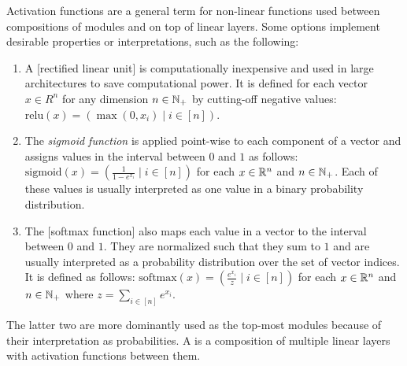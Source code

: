 \documentclass[../document.tex]{subfiles}
\begin{document}
    Activation functions are a general term for non-linear functions used between compositions of modules and on top of linear layers.
    Some options implement desirable properties or interpretations, such as the following:
    \begin{enumerate}
        \item
            A [rectified linear unit]  is computationally inexpensive and used in large architectures to save computational power.
            It is defined for each vector \(x\in R^n\) for any dimension \(n \in \mathbb{N}_+\) by cutting-off negative values: \(\mathrm{relu}(x) = (\max(0, x_i) \mid i \in [n])\).
        \item
            The \emph{sigmoid function} is applied point-wise to each component of a vector and assigns values in the interval between \(0\) and \(1\) as follows: \(\mathrm{sigmoid}(x) = (\frac{1}{1-e^{x_i}} \mid i \in [n])\) for each \(x \in \mathbb{R}^n\) and \(n \in \mathbb{N}_+\).
            Each of these values is usually interpreted as one value in a binary probability distribution.
        \item
            The [softmax function] also maps each value in a vector to the interval between \(0\) and \(1\).
            They are normalized such that they sum to \(1\) and are usually interpreted as a probability distribution over the set of vector indices.
            It is defined as follows: \(\mathrm{softmax}(x) = (\frac{e^{x_i}}{z} \mid i \in [n])\) for each \(x\in \mathbb{R}^n\) and \(n \in \mathbb{N}_+\) where \(z = \sum_{i \in [n]} e^{x_i}\).
    \end{enumerate}
    The latter two are more dominantly used as the top-most modules because of their interpretation as probabilities.
    A   is a composition of multiple linear layers with activation functions between them.
\end{document}
